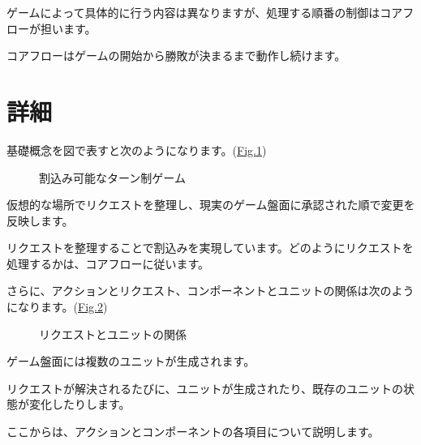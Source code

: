 \documentclass[letterpaper,10pt,dvipdfmx]{sphinxmanual}
\begin{document}
\sphinxAtStartPar
ゲームによって具体的に行う内容は異なりますが、処理する順番の制御はコアフローが担います。

\sphinxAtStartPar
コアフローはゲームの開始から勝敗が決まるまで動作し続けます。


\section{詳細}
\label{\detokenize{core/core:id12}}
\sphinxAtStartPar
基礎概念を図で表すと次のようになります。(\hyperref[\detokenize{core/core:abstract-core-image}]{Fig.\@ \ref{\detokenize{core/core:abstract-core-image}}})

\begin{figure}[htbp]
\centering
\capstart

\noindent{}
\caption{割込み可能なターン制ゲーム}\label{\detokenize{core/core:id35}}\label{\detokenize{core/core:abstract-core-image}}\end{figure}

\sphinxAtStartPar
仮想的な場所でリクエストを整理し、現実のゲーム盤面に承認された順で変更を反映します。

\sphinxAtStartPar
リクエストを整理することで割込みを実現しています。どのようにリクエストを処理するかは、コアフローに従います。

\sphinxAtStartPar
さらに、アクションとリクエスト、コンポーネントとユニットの関係は次のようになります。(\hyperref[\detokenize{core/core:action-request-image}]{Fig.\@ \ref{\detokenize{core/core:action-request-image}}})

\begin{figure}[htbp]
\centering
\capstart

\noindent{}
\caption{リクエストとユニットの関係}\label{\detokenize{core/core:id36}}\label{\detokenize{core/core:action-request-image}}\end{figure}

\sphinxAtStartPar
ゲーム盤面には複数のユニットが生成されます。

\sphinxAtStartPar
リクエストが解決されるたびに、ユニットが生成されたり、既存のユニットの状態が変化したりします。

\sphinxAtStartPar
ここからは、アクションとコンポーネントの各項目について説明します。
\end{document}
